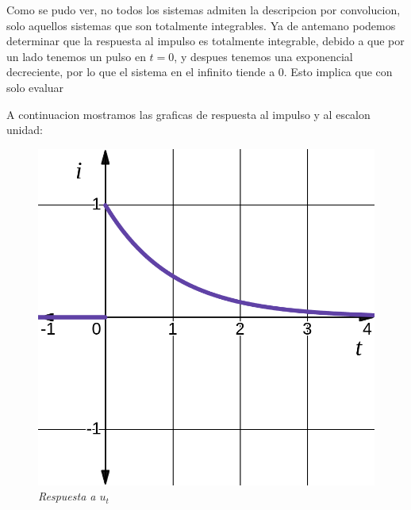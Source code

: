 \documentclass[12pt,a4paper]{report}
\begin{document}
\begin{enumerate}[label=\alph*)]
\begin{table}[h!]
\begin{tabular}{|c|c|c|c|}
        \end{tabular}
      \end{table}

      Como se pudo ver, no todos los sistemas admiten la descripcion por convolucion, solo aquellos sistemas que son
      totalmente integrables. Ya de antemano podemos determinar que la respuesta al impulso es totalmente integrable,
      debido a que por un lado tenemos un pulso en $t=0$, y despues tenemos una exponencial decreciente, por lo que
      el sistema en el infinito tiende a 0. Esto implica que con solo evaluar 

      A continuacion mostramos las graficas de respuesta al impulso y al escalon unidad:
      
      \noindent
      \begin{figure}[h]
        \centering
        \begin{minipage}[h]{0.4\textwidth}
          \centering
          \includegraphics[width=1\textwidth]{./images/ej4.2.png}
          \textit{Respuesta a $u_t$}
        \end{minipage}
        \hspace{5mm}
        \begin{minipage}[h]{0.4\textwidth}
          \centering

\end{minipage}
\end{figure}
\end{enumerate}
\end{document}
